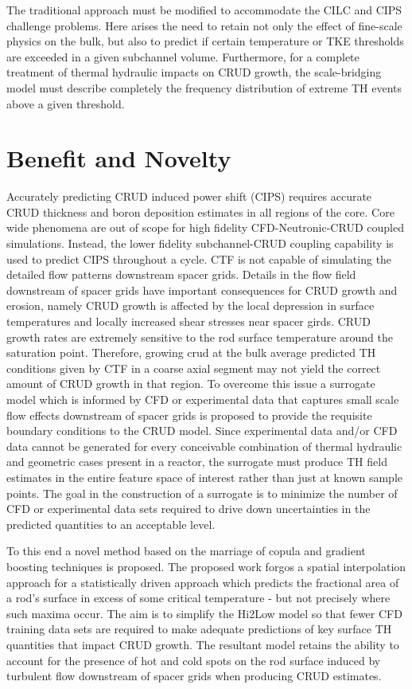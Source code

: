 The traditional approach must be modified to accommodate the CILC and CIPS
challenge problems.  Here arises the need to retain not only the effect of
fine-scale physics on the bulk, but also to predict if certain temperature or
TKE thresholds are exceeded in a given subchannel volume.  Furthermore, for a
complete treatment of thermal hydraulic impacts on CRUD growth, the
scale-bridging model must describe completely the frequency distribution of
extreme TH events above a given threshold.


\section{Benefit and Novelty}

Accurately predicting CRUD induced power shift (CIPS) requires accurate CRUD
thickness and boron deposition estimates in all regions of the core.  Core wide
phenomena are out of scope for high fidelity CFD-Neutronic-CRUD coupled
simulations.  Instead, the lower fidelity subchannel-CRUD coupling capability is used to
predict CIPS throughout a cycle.  CTF is not capable of simulating the detailed
flow patterns downstream spacer grids.  Details in the flow field
downstream of spacer grids have important consequences for CRUD growth and
erosion, namely CRUD growth is affected by the local depression in surface temperatures and locally
increased shear stresses near spacer girds.  CRUD growth rates are extremely sensitive to the rod surface
temperature around the saturation point.  Therefore, growing crud at the bulk
average predicted TH conditions given by CTF in a coarse axial segment may not
yield the correct amount of CRUD growth in that region.  To overcome this issue
a surrogate model which is informed by CFD or experimental data that captures
small scale flow effects downstream of spacer grids is proposed to provide the requisite
boundary conditions to the CRUD model.  Since experimental data and/or CFD data
cannot be generated for every conceivable combination of thermal hydraulic and
geometric cases present in a reactor, the surrogate must produce
TH field estimates in the entire feature space of interest rather than just at known
sample points.  The goal in the construction of a surrogate is to minimize the
number of CFD or experimental data sets required to drive down uncertainties in
the predicted quantities to an acceptable level.

To this end a novel method based on the marriage of copula and gradient
boosting techniques is proposed.  The proposed work forgos a spatial
interpolation approach for a statistically driven approach which predicts the
fractional area of a rod's surface in excess of some critical temperature - but
not precisely where such maxima occur.  The aim is to simplify the Hi2Low model
so that fewer CFD training data sets are required to make adequate predictions
of key surface TH quantities that impact CRUD growth.  The resultant model
retains the ability to account for the presence of hot and cold spots on the rod surface induced by
turbulent flow downstream of spacer grids when producing CRUD estimates.

